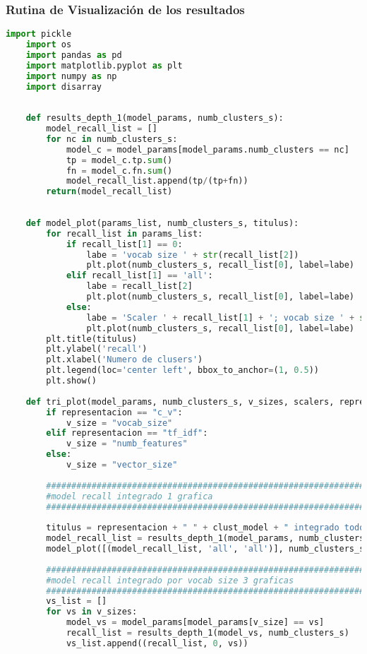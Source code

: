 \documentclass[12pt]{article}
\begin{document}
	\subsubsection*{Rutina de Visualización de los resultados}
	\begin{lstlisting}[language=Python, caption = Rutina de Visualización]
	import pickle
	import os
	import pandas as pd
	import matplotlib.pyplot as plt
	import numpy as np 
	import disarray
	
	
	def results_depth_1(model_params, numb_clusters_s):
	    model_recall_list = []
	    for nc in numb_clusters_s:
	        model_c = model_params[model_params.numb_clusters == nc]
	        tp = model_c.tp.sum()
	        fn = model_c.fn.sum()
	        model_recall_list.append(tp/(tp+fn))
	    return(model_recall_list)
	
	
	def model_plot(params_list, numb_clusters_s, titulus):
	    for recall_list in params_list:
	        if recall_list[1] == 0:
	            labe = 'vocab size ' + str(recall_list[2])
	            plt.plot(numb_clusters_s, recall_list[0], label=labe)
	        elif recall_list[1] == 'all':
	            labe = recall_list[2]
	            plt.plot(numb_clusters_s, recall_list[0], label=labe)            
	        else:
	            labe = 'Scaler ' + recall_list[1] + '; vocab size ' + str(recall_list[2])
	            plt.plot(numb_clusters_s, recall_list[0], label=labe)        
	    plt.title(titulus)
	    plt.ylabel('recall')
	    plt.xlabel('Numero de clusers')
	    plt.legend(loc='center left', bbox_to_anchor=(1, 0.5))
	    plt.show()
	
	def tri_plot(model_params, numb_clusters_s, v_sizes, scalers, representacion, clust_model):
	    if representacion == "c_v":
	        v_size = "vocab_size"
	    elif representacion == "tf_idf":
	        v_size = "numb_features"
	    else:
	        v_size = "vector_size"
	    
	    ##########################################################################
	    #model recall integrado 1 grafica
	    ##########################################################################
	    
	    titulus = representacion + " " + clust_model + " integrado todo"
	    model_recall_list = results_depth_1(model_params, numb_clusters_s)
	    model_plot([(model_recall_list, 'all', 'all')], numb_clusters_s, titulus)
	    
	    ##########################################################################
	    #model recall integrado por vocab size 3 graficas
	    ##########################################################################
	    vs_list = []
	    for vs in v_sizes:
	        model_vs = model_params[model_params[v_size] == vs]
	        recall_list = results_depth_1(model_vs, numb_clusters_s)
	        vs_list.append((recall_list, 0, vs))   
	        

\end{lstlisting}
\end{document}
